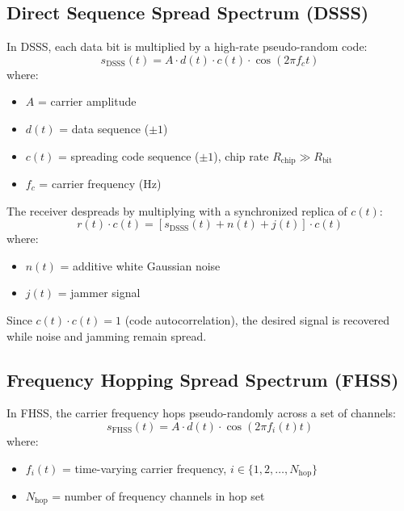 \subsection{Direct Sequence Spread Spectrum (DSSS)}

In DSSS, each data bit is multiplied by a high-rate pseudo-random code:
\begin{equation}
s_{\text{DSSS}}(t) = A \cdot d(t) \cdot c(t) \cdot \cos(2\pi f_c t)
\label{eq:dsss-signal}
\end{equation}
where:
\begin{itemize}
\item $A$ = carrier amplitude
\item $d(t)$ = data sequence ($\pm 1$)
\item $c(t)$ = spreading code sequence ($\pm 1$), chip rate $R_{\text{chip}} \gg R_{\text{bit}}$
\item $f_c$ = carrier frequency (Hz)
\end{itemize}

The receiver despreads by multiplying with a synchronized replica of $c(t)$:
\begin{equation}
r(t) \cdot c(t) = [s_{\text{DSSS}}(t) + n(t) + j(t)] \cdot c(t)
\label{eq:dsss-despread}
\end{equation}
where:
\begin{itemize}
\item $n(t)$ = additive white Gaussian noise
\item $j(t)$ = jammer signal
\end{itemize}

Since $c(t) \cdot c(t) = 1$ (code autocorrelation), the desired signal is recovered while noise and jamming remain spread.

\subsection{Frequency Hopping Spread Spectrum (FHSS)}

In FHSS, the carrier frequency hops pseudo-randomly across a set of channels:
\begin{equation}
s_{\text{FHSS}}(t) = A \cdot d(t) \cdot \cos(2\pi f_i(t) t)
\label{eq:fhss-signal}
\end{equation}
where:
\begin{itemize}
\item $f_i(t)$ = time-varying carrier frequency, $i \in \{1, 2, \ldots, N_{\text{hop}}\}$
\item $N_{\text{hop}}$ = number of frequency channels in hop set
\end{itemize}

